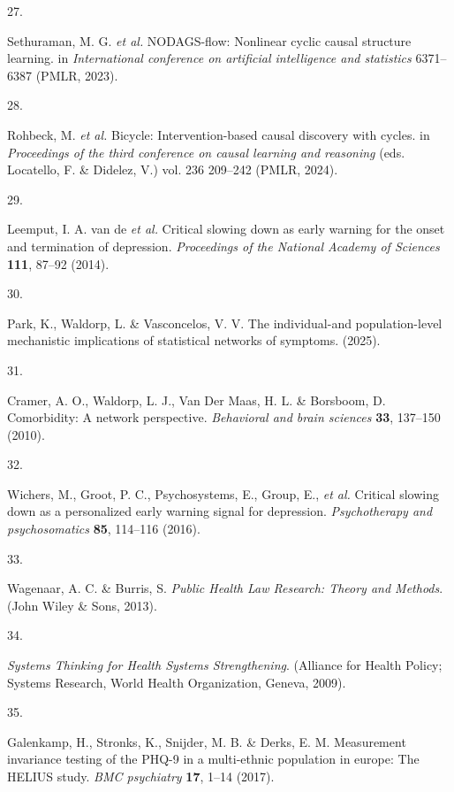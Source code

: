 \documentclass[
]{article}
\newlength{\cslhangindent}
\newlength{\csllabelwidth}
\newenvironment{CSLReferences}[2] %
 {\begin{list}{}{%
  \setlength{\itemindent}{0pt}
  \setlength{\leftmargin}{0pt}
  \setlength{\parsep}{0pt}
  \ifodd #1
   \setlength{\leftmargin}{\cslhangindent}
   \setlength{\itemindent}{-1\cslhangindent}
  \fi
  \setlength{\itemsep}{#2\baselineskip}}}
 {\end{list}}
\newcommand{\CSLLeftMargin}[1]{\parbox[t]{\csllabelwidth}{\strut#1\strut}}
\newcommand{\CSLRightInline}[1]{\parbox[t]{\linewidth - \csllabelwidth}{\strut#1\strut}}
\begin{document}
\begin{CSLReferences}{0}{0}
\CSLLeftMargin{27. }%
\CSLRightInline{Sethuraman, M. G. \emph{et al.} NODAGS-flow: Nonlinear
cyclic causal structure learning. in \emph{International conference on
artificial intelligence and statistics} 6371--6387 (PMLR, 2023).}

\CSLLeftMargin{28. }%
\CSLRightInline{Rohbeck, M. \emph{et al.} Bicycle: Intervention-based
causal discovery with cycles. in \emph{Proceedings of the third
conference on causal learning and reasoning} (eds. Locatello, F. \&
Didelez, V.) vol. 236 209--242 (PMLR, 2024).}

\CSLLeftMargin{29. }%
\CSLRightInline{Leemput, I. A. van de \emph{et al.} Critical slowing
down as early warning for the onset and termination of depression.
\emph{Proceedings of the National Academy of Sciences} \textbf{111},
87--92 (2014).}

\CSLLeftMargin{30. }%
\CSLRightInline{Park, K., Waldorp, L. \& Vasconcelos, V. V. The
individual-and population-level mechanistic implications of statistical
networks of symptoms. (2025).}

\CSLLeftMargin{31. }%
\CSLRightInline{Cramer, A. O., Waldorp, L. J., Van Der Maas, H. L. \&
Borsboom, D. Comorbidity: A network perspective. \emph{Behavioral and
brain sciences} \textbf{33}, 137--150 (2010).}

\CSLLeftMargin{32. }%
\CSLRightInline{Wichers, M., Groot, P. C., Psychosystems, E., Group, E.,
\emph{et al.} Critical slowing down as a personalized early warning
signal for depression. \emph{Psychotherapy and psychosomatics}
\textbf{85}, 114--116 (2016).}

\CSLLeftMargin{33. }%
\CSLRightInline{Wagenaar, A. C. \& Burris, S. \emph{Public Health Law
Research: Theory and Methods}. (John Wiley \& Sons, 2013).}

\CSLLeftMargin{34. }%
\CSLRightInline{\emph{Systems Thinking for Health Systems
Strengthening}. (Alliance for Health Policy; Systems Research, World
Health Organization, Geneva, 2009).}

\CSLLeftMargin{35. }%
\CSLRightInline{Galenkamp, H., Stronks, K., Snijder, M. B. \& Derks, E.
M. Measurement invariance testing of the PHQ-9 in a multi-ethnic
population in europe: The HELIUS study. \emph{BMC psychiatry}
\textbf{17}, 1--14 (2017).}


\end{CSLReferences}
\end{document}
